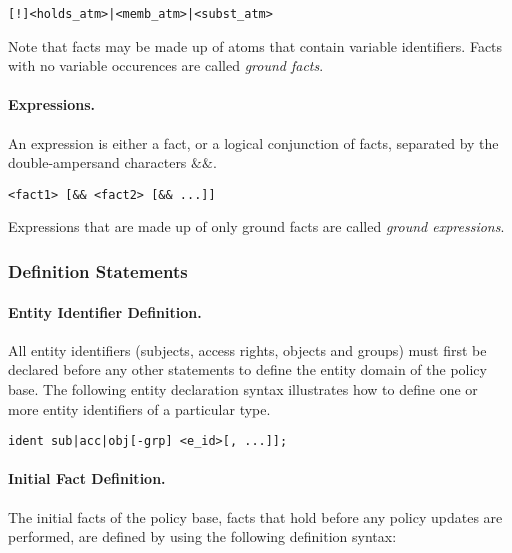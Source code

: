 \documentclass[10pt, twocolumn]{article}
\begin{document}
          \begin{verbatim}[!]<holds_atm>|<memb_atm>|<subst_atm>\end{verbatim}

          Note that facts may be made up of atoms that contain variable
          identifiers. Facts with no variable occurences are called
          {\em ground facts}.
 
        \paragraph{Expressions.}
          An expression is either a fact, or a logical conjunction of facts,
          separated by the double-ampersand characters $\&\&$.

          \begin{verbatim}<fact1> [&& <fact2> [&& ...]]\end{verbatim}

          Expressions that are made up of only ground facts are called
          {\em ground expressions}.

      \subsubsection{Definition Statements}

        \paragraph{Entity Identifier Definition.}

          All entity identifiers (subjects, access rights, objects and groups)
          must first be declared before any other statements to define the
          entity domain of the policy base. The following entity declaration
          syntax illustrates how to define one or more entity identifiers of a
          particular type.

          \begin{verbatim}ident sub|acc|obj[-grp] <e_id>[, ...]];\end{verbatim}

        \paragraph{Initial Fact Definition.}

          The initial facts of the policy base, facts that hold before any
          policy updates are performed, are defined by using the following
          definition syntax:
\end{document}
